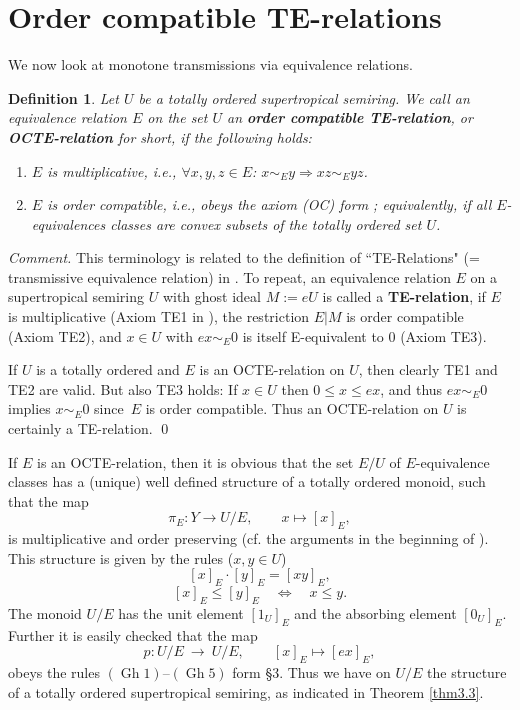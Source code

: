 \documentclass [12pt,a4paper,reqno]{amsart}
\newtheorem{defn}[thm]{Definition}
\begin{document}
\section{Order compatible TE-relations}\label{sec:6}
We now look at monotone transmissions via equivalence relations.

\begin{defn}\label{defn6.1} Let $U$ be a totally ordered
supertropical semiring. We call an equivalence  relation $E$ on
the set $U$ an \textbf{order compatible TE-relation}, or
\textbf{OCTE-relation} for short, if the following holds:

\begin{enumerate}
    \item $E$ is multiplicative, i.e., $\forall x,y,z \in E$: $x \sim_E y \Rightarrow xz \sim_E
    yz$.
    \item $E$ is {order compatible}, i.e., obeys the axiom
    (OC) form \cite[\S4]{IKR2}; equivalently, if all $E$-equivalences classes
    are convex subsets of the totally ordered set $U$.
\end{enumerate}
\end{defn}

\emph{Comment.} This terminology is related to the definition of
``TE-Relations"  (= transmissive equivalence relation) in
\cite[\S4]{IKR2}. To repeat, an equivalence relation $E$ on a
supertropical semiring $U$ with ghost ideal $M := eU$ is called a
\textbf{TE-relation}, if $E$ is multiplicative (Axiom TE1 in
\cite[\S4]{IKR2}), the restriction $E | M$ is order compatible
(Axiom TE2), and $x \in U $ with  $ex \sim_E 0$ is itself
E-equivalent to $0$ (Axiom TE3).

If $U$ is a totally ordered and $E$ is an OCTE-relation on $U$,
then clearly TE1 and TE2 are valid. But also TE3 holds: If $x \in
U$ then $0 \leq x \leq ex$, and thus $ex \sim_E 0$ implies $x
\sim_E 0$ since~$E$ is order compatible. Thus an OCTE-relation on
$U$ is certainly a  TE-relation. { \hfill\quad\qed}

{\vskip 1.5mm \noindent}

If $E$ is an OCTE-relation, then it is obvious that the set $E/U$
of $E$-equivalence classes has a (unique) well defined structure
of a totally ordered monoid, such that the map $$\pi_E  : Y \to
U/E, \qquad x \mapsto [x]_E,$$ is multiplicative and order
preserving (cf. the arguments in the beginning of
\cite[\S4]{IKR2}).
This structure is given by
the rules ($x,y \in U$) \begin{equation}\label{eq:6.1} [x]_E \cdot
[y]_E = [xy]_E,
\end{equation}
 \begin{equation}\label{eq:6.2} [x]_E \leq [y]_E  {\quad {\Leftrightarrow} \quad } x \leq y.
\end{equation}
The monoid $U/E$ has the unit element $[1_U]_E$ and the absorbing
element $[0_U]_E$. Further it is easily checked that the map
$$ p: U/ E {\ {\to} \ } U/E, \qquad [x]_E \mapsto [ex]_E,$$
obeys the rules $({\operatorname{Gh}}1)$--$({\operatorname{Gh}}5)$ form \S3. Thus we have on $U/E$
the structure of a totally ordered supertropical semiring, as
indicated in Theorem \ref{thm3.3}.
\end{document}

